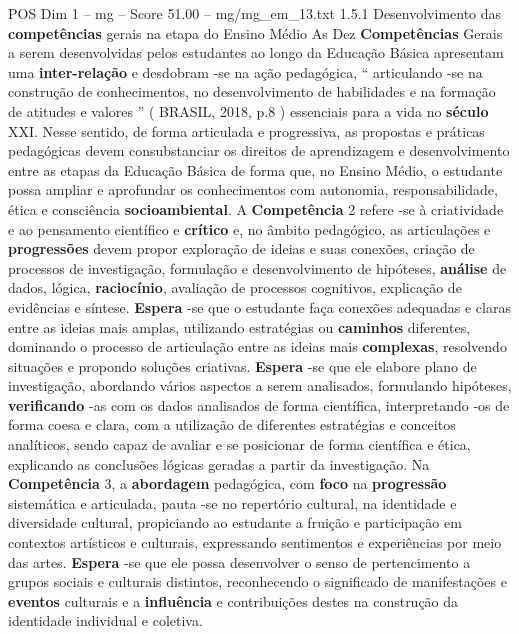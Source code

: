 \begin{textsample}{POS Dim 1 – mg – Score 51.00 – mg/mg\_em\_13.txt}  \label{ex:f1_pos_233}
1.5.1 Desenvolvimento das \textbf{competências} gerais na etapa do Ensino Médio As Dez \textbf{Competências} Gerais a serem desenvolvidas pelos estudantes ao longo da Educação Básica apresentam uma \textbf{inter-relação} e desdobram -se na ação pedagógica, “ articulando -se na construção de conhecimentos, no desenvolvimento de habilidades e na formação de atitudes e valores ” ( BRASIL, 2018, p.8 ) essenciais para a vida no \textbf{século} XXI.
Nesse sentido, de forma articulada e progressiva, as propostas e práticas pedagógicas devem consubstanciar os direitos de aprendizagem e desenvolvimento entre as etapas da Educação Básica de forma que, no Ensino Médio, o estudante possa ampliar e aprofundar os conhecimentos com autonomia, responsabilidade, ética e consciência \textbf{socioambiental}.
A \textbf{Competência} 2 refere -se à criatividade e ao pensamento científico e \textbf{crítico} e, no âmbito pedagógico, as articulações e \textbf{progressões} devem propor exploração de ideias e suas conexões, criação de processos de investigação, formulação e desenvolvimento de hipóteses, \textbf{análise} de dados, lógica, \textbf{raciocínio}, avaliação de processos cognitivos, explicação de evidências e síntese. \textbf{Espera} -se que o estudante faça conexões adequadas e claras entre as ideias mais amplas, utilizando estratégias ou \textbf{caminhos} diferentes, dominando o processo de articulação entre as ideias mais \textbf{complexas}, resolvendo situações e propondo soluções criativas. \textbf{Espera} -se que ele elabore plano de investigação, abordando vários aspectos a serem analisados, formulando hipóteses, \textbf{verificando} -as com os dados analisados de forma científica, interpretando -os de forma coesa e clara, com a utilização de diferentes estratégias e conceitos analíticos, sendo capaz de avaliar e se posicionar de forma científica e ética, explicando as conclusões lógicas geradas a partir da investigação.
Na \textbf{Competência} 3, a \textbf{abordagem} pedagógica, com \textbf{foco} na \textbf{progressão} sistemática e articulada, pauta -se no repertório cultural, na identidade e diversidade cultural, propiciando ao estudante a fruição e participação em contextos artísticos e culturais, expressando sentimentos e experiências por meio das artes. \textbf{Espera} -se que ele possa desenvolver o senso de pertencimento a grupos sociais e culturais distintos, reconhecendo o significado de manifestações e \textbf{eventos} culturais e a \textbf{influência} e contribuições destes na construção da identidade individual e coletiva.

\end{textsample}

